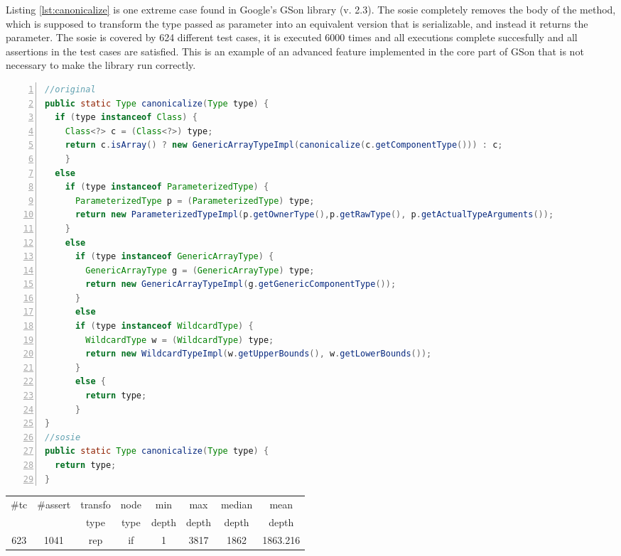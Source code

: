 Listing \ref{lst:canonicalize} is one extreme case found in Google's GSon library (v. 2.3). 
The sosie completely removes the body of the method, which is supposed to transform the type passed as parameter into an equivalent version that is serializable, and instead it returns the parameter. 
The sosie is covered by 624 different test cases, it is executed 6000 times and all executions complete succesfully and all assertions in the test cases are satisfied. 
This is an example of an advanced feature implemented in the core part of GSon that is not necessary to make the library run correctly.

\begin{minipage}{\columnwidth}
\begin{lstlisting}[caption={\texttt{canonicalize} in EasyMock and a sosie},label={lst:canonicalize},language=java,numbers=left]
//original
public static Type canonicalize(Type type) {
  if (type instanceof Class) {
    Class<?> c = (Class<?>) type;
    return c.isArray() ? new GenericArrayTypeImpl(canonicalize(c.getComponentType())) : c;
    } 
  else 
    if (type instanceof ParameterizedType) {
      ParameterizedType p = (ParameterizedType) type;
      return new ParameterizedTypeImpl(p.getOwnerType(),p.getRawType(), p.getActualTypeArguments());
    } 
    else 
      if (type instanceof GenericArrayType) {
        GenericArrayType g = (GenericArrayType) type;
        return new GenericArrayTypeImpl(g.getGenericComponentType());
      } 
      else 
      if (type instanceof WildcardType) {
        WildcardType w = (WildcardType) type;
        return new WildcardTypeImpl(w.getUpperBounds(), w.getLowerBounds());
      } 
      else {
        return type;
      }
}
//sosie
public static Type canonicalize(Type type) {
  return type;
}
\end{lstlisting}
\tabcolsep=0.11cm
\begin{tabular}{>{\small}c>{\small}c>{\small}c>{\small}c>{\small}c>{\small}c>{\small}c>{\small}c}
\hline
\rowcolor{lightgray} \#tc & \#assert & transfo & node & min & max & median & mean   \\
\rowcolor{lightgray}  & & type & type & depth  & depth & depth & depth  \\ 
\hline
623 & 1041 & rep & if  &1  &3817  &1862  &1863.216 \\
\hline
\end{tabular}
\end{minipage}